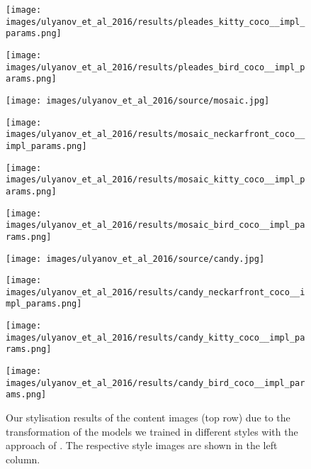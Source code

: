 \begin{figure}[H]
\begin{minipage}[t]{0.24\textwidth}
	\end{minipage}
	\hfill%
	\begin{minipage}[t]{0.24\textwidth}
		\centering
		\texttt{[image: images/ulyanov\_et\_al\_2016/results/pleades\_kitty\_coco\_\_impl\_params.png]}
	\end{minipage}
	\hfill%
	\begin{minipage}[t]{0.24\textwidth}
		\centering
		\texttt{[image: images/ulyanov\_et\_al\_2016/results/pleades\_bird\_coco\_\_impl\_params.png]}
	\end{minipage}
	\hfill%
	\begin{minipage}[t]{0.24\textwidth}
		\centering
		\texttt{[image: images/ulyanov\_et\_al\_2016/source/mosaic.jpg]}
	\end{minipage}
	\hfill%
	\begin{minipage}[t]{0.24\textwidth}
		\centering
		\texttt{[image: images/ulyanov\_et\_al\_2016/results/mosaic\_neckarfront\_coco\_\_impl\_params.png]}
	\end{minipage}
	\hfill%
	\begin{minipage}[t]{0.24\textwidth}
		\centering
		\texttt{[image: images/ulyanov\_et\_al\_2016/results/mosaic\_kitty\_coco\_\_impl\_params.png]}
	\end{minipage}
	\hfill%
	\begin{minipage}[t]{0.24\textwidth}
		\centering
		\texttt{[image: images/ulyanov\_et\_al\_2016/results/mosaic\_bird\_coco\_\_impl\_params.png]}
	\end{minipage}
	\hfill%
	\begin{minipage}[t]{0.24\textwidth}
		\centering
		\texttt{[image: images/ulyanov\_et\_al\_2016/source/candy.jpg]}
	\end{minipage}
	\hfill%
	\begin{minipage}[t]{0.24\textwidth}
		\centering
		\texttt{[image: images/ulyanov\_et\_al\_2016/results/candy\_neckarfront\_coco\_\_impl\_params.png]}
	\end{minipage}
	\hfill%
	\begin{minipage}[t]{0.24\textwidth}
		\centering
		\texttt{[image: images/ulyanov\_et\_al\_2016/results/candy\_kitty\_coco\_\_impl\_params.png]}
	\end{minipage}
	\hfill%
	\begin{minipage}[t]{0.24\textwidth}
		\centering
		\texttt{[image: images/ulyanov\_et\_al\_2016/results/candy\_bird\_coco\_\_impl\_params.png]}
	\end{minipage}
	\caption{Our stylisation results of the content images (top row) due to the transformation of the models we trained in different styles with the approach of \cite{ULVL2016}. The respective style images are shown in the left column.}
	\label{fig:ulyanov_et_al_2016_impl}
\end{figure}

